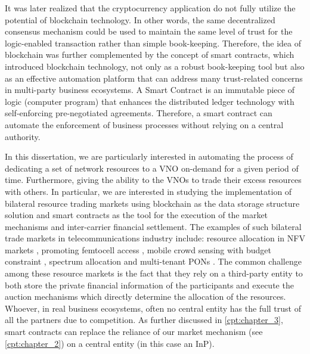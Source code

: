 It was later realized that the cryptocurrency application do not fully utilize the potential of blockchain technology. In other words, the same decentralized consensus mechanism could be used to maintain the same level of trust for the logic-enabled transaction rather than simple book-keeping. Therefore, the idea of blockchain was further complemented by the concept of smart contracts, which introduced blockchain technology, not only as a robust book-keeping tool but also as an effective automation platform that can address many trust-related concerns in multi-party business ecosystems. A Smart Contract is an immutable piece of logic (computer program) that enhances the distributed ledger technology with self-enforcing pre-negotiated agreements. 
Therefore, a smart contract can automate the enforcement of business processes without relying on a central authority.

In this dissertation, we are particularly interested in automating the process of dedicating a set of network resources to a \ac{VNO} on-demand for a given period of time. Furthermore, giving the ability to the \acp{VNO} to trade their excess resources with others. In particular, we are interested in studying the implementation of bilateral resource trading markets using blockchain as the data storage structure solution and smart contracts as the tool for the execution of the market mechanisms and inter-carrier financial settlement. The examples of such bilateral trade markets in telecommunications industry include: resource allocation in \ac{NFV} markets \cite{8542782}, promoting femtocell access \cite{8665886}, mobile crowd sensing with budget constraint \cite{8664672}, spectrum allocation \cite{8395445} and multi-tenant \acp{PON} \cite{8488596}. The common challenge among these resource markets is the fact that they rely on a third-party entity to both store the private financial information of the participants and execute the auction mechanisms which directly determine the allocation of the resources. Whoever, in real business ecosystems, often no central entity has the full trust of all the partners due to competition.
As further discussed in \autoref{cpt:chapter_3}, smart contracts can replace the reliance of our market mechanism (see \autoref{cpt:chapter_2}) on a central entity (in this case an \ac{InP}).

